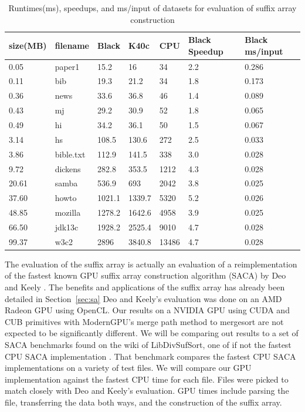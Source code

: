 \begin{table}[h]
\begin{tabular}{@{}lllllll@{}}
\toprule
size(MB) & filename  & Black  & K40c   & CPU   & Black Speedup & Black ms/input \\ \midrule
0.05     & paper1    & 15.2   & 16     & 34    & 2.2           & 0.286          \\
0.11     & bib       & 19.3   & 21.2   & 34    & 1.8           & 0.173          \\
0.36     & news      & 33.6   & 36.8   & 46    & 1.4           & 0.089          \\
0.43     & mj        & 29.2   & 30.9   & 52    & 1.8           & 0.065          \\
0.49     & hi        & 34.2   & 36.1   & 50    & 1.5           & 0.067          \\
3.14     & hs        & 108.5  & 130.6  & 272   & 2.5           & 0.033          \\
3.86     & bible.txt & 112.9  & 141.5  & 338   & 3.0           & 0.028          \\
9.72     & dickens   & 282.8  & 353.5  & 1212  & 4.3           & 0.028          \\
20.61    & samba     & 536.9  & 693    & 2042  & 3.8           & 0.025          \\
37.60    & howto     & 1021.1 & 1339.7 & 5320  & 5.2           & 0.026          \\
48.85    & mozilla   & 1278.2 & 1642.6 & 4958  & 3.9           & 0.025          \\
66.50    & jdk13c    & 1928.2 & 2525.4 & 9010  & 4.7           & 0.028          \\
99.37    & w3c2      & 2896   & 3840.8 & 13486 & 4.7           & 0.028          \\ \bottomrule
\end{tabular}
\caption{Runtimes(ms), speedups, and ms/input of datasets for evaluation of suffix array construction}
\label{tab:sadata}
\end{table}

The evaluation of the suffix array is actually an evaluation of a reimplementation of the fastest known GPU suffix array construction algorithm (SACA) by Deo and Keely \cite{Deo}.
The benefits and applications of the suffix array has already been detailed in Section~\ref{sec:sa} 
Deo and Keely's evaluation was done on an AMD Radeon GPU using OpenCL.
Our results on a NVIDIA GPU using CUDA and CUB primitives with ModernGPU's merge path method to mergesort are not expected to be significantly different.
We will be comparing out results to a set of SACA benchmarks found on the wiki of LibDivSufSort, one of if not the fastest CPU SACA implementation \cite{SACA}.
That benchmark compares the fastest CPU SACA implementations on a variety of test files.
We will compare our GPU implementation against the fastest CPU time for each file.
Files were picked to match closely with Deo and Keely's evaluation.
GPU times include parsing the file, transferring the data both ways, and the construction of the suffix array.

